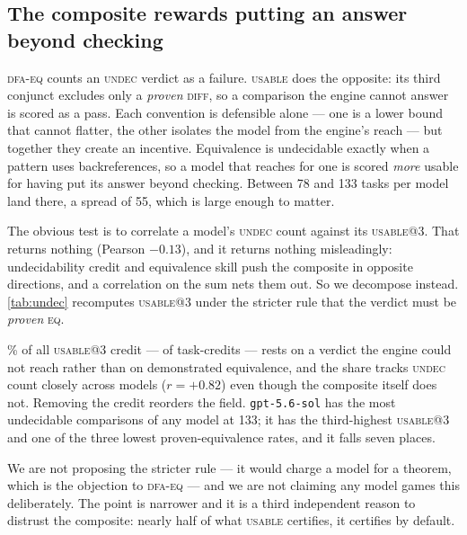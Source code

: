 \documentclass[11pt]{article}
\newcommand{\usable}{\textsc{usable}}
\newcommand{\dfaeq}{\textsc{dfa-eq}}
\begin{document}
\subsection{The composite rewards putting an answer beyond checking}
\label{sec:undec}

\dfaeq{} counts an \textsc{undec} verdict as a failure. \usable{} does the
opposite: its third conjunct excludes only a \emph{proven} \textsc{diff}, so a
comparison the engine cannot answer is scored as a pass. Each convention is
defensible alone --- one is a lower bound that cannot flatter, the other
isolates the model from the engine's reach --- but together they create an
incentive. Equivalence is undecidable exactly when a pattern uses
backreferences, so a model that reaches for one is scored \emph{more} usable
for having put its answer beyond checking. Between 78 and 133 tasks per model
land there, a spread of 55, which is large enough to matter.

The obvious test is to correlate a model's \textsc{undec} count against its
\usable{}@3. That returns nothing (Pearson $-0.13$), and it returns nothing
misleadingly: undecidability credit and equivalence skill push the composite
in opposite directions, and a correlation on the sum nets them out. So we
decompose instead. \cref{tab:undec} recomputes \usable{}@3 under the stricter
rule that the verdict must be \emph{proven} \textsc{eq}.

\begin{table}[htbp]
\centering
\small

\caption{What the undecidability convention is worth. ``Proven-\textsc{eq}
only'' requires a demonstrated equivalence rather than the absence of a
demonstrated difference; the final columns are the tasks that separate the
two.}
\label{tab:undec}
\end{table}

\undecshare{}\% of all \usable{}@3 credit --- \undecsupported{} of
\undecusable{} task-credits --- rests on a verdict the engine could not reach
rather than on demonstrated equivalence, and the share tracks \textsc{undec}
count closely across models ($r = +0.82$) even though the composite itself
does not. Removing the credit reorders the field. \texttt{gpt-5.6-sol} has the
most undecidable comparisons of any model at 133; it has the third-highest
\usable{}@3 and one of the three lowest proven-equivalence rates, and it falls
seven places.

We are not proposing the stricter rule --- it would charge a model for a
theorem, which is the objection to \dfaeq{} --- and we are not claiming any
model games this deliberately. The point is narrower and it is a third
independent reason to distrust the composite: nearly half of what
\usable{} certifies, it certifies by default.
\end{document}
